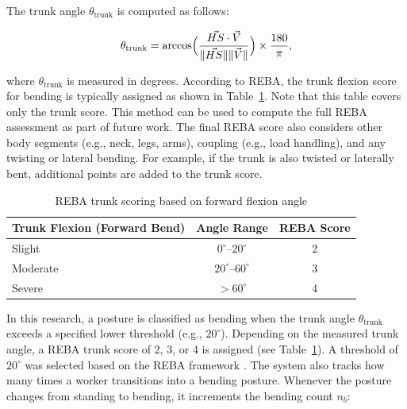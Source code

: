 \documentclass[11pt]{article}
\renewcommand{\baselinestretch}{1.5}
\begin{document}
\noindent The trunk angle \(\theta_{\text{trunk}}\) is computed as follows:

\begin{equation}
    \theta_{\text{trunk}} 
    = \arccos \Bigl( \frac{\vec{HS} \cdot \vec{V}}{\|\vec{HS}\|\|\vec{V}\|} \Bigr)
    \times \frac{180}{\pi},
\end{equation}

\noindent where \(\theta_{\text{trunk}}\) is measured in degrees. According to REBA, the trunk flexion score for bending is typically assigned as shown in Table~\ref{table:trunkscore}. Note that this table covers only the trunk score. This method can be used to compute the full REBA assessment as part of future work. The final REBA score also considers other body segments (e.g., neck, legs, arms), coupling (e.g., load handling), and any twisting or lateral bending. For example, if the trunk is also twisted or laterally bent, additional points are added to the trunk score.

\begin{table}[H]
\renewcommand{\baselinestretch}{1.0}\selectfont %
\renewcommand{\arraystretch}{0.92}              %
\setlength{\tabcolsep}{4pt}                     %
\centering
\small
\caption{REBA trunk scoring based on forward flexion angle}
\begin{tabular}{l|c|c}
\hline
\textbf{Trunk Flexion (Forward Bend)} & \textbf{Angle Range} & \textbf{REBA Score} \\
\hline
Slight & $0^\circ$--$20^\circ$ & 2 \\
Moderate & $20^\circ$--$60^\circ$ & 3 \\
Severe & $>60^\circ$ & 4 \\
\hline
\end{tabular}
\label{table:trunkscore}
\end{table}

In this research, a posture is classified as bending when the trunk angle \(\theta_{\text{trunk}}\) exceeds a specified lower threshold (e.g., $20^\circ$).
Depending on the measured trunk angle, a REBA trunk score of 2, 3, or 4 is assigned (see Table~\ref{table:trunkscore}). A threshold of $20^\circ$ was selected based on the REBA framework \citep{hignett2000rapid}. The system also tracks how many times a worker transitions into a bending posture. Whenever the posture changes from standing to bending, it increments the bending count \(n_b\):
\end{document}
